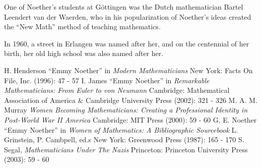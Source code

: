 \documentclass[12pt]{article}
\begin{document}
One of Noether's students at G\"ottingen was the Dutch mathematician Bartel Leendert van der Waerden, who in his popularization of Noether's ideas created the ``New Math'' method of teaching mathematics.

In 1960, a street in Erlangen was named after her, and on the centennial of her birth, her old high school was also named after her.

\begin{thebibliography}{5}
 H. Henderson ``Emmy Noether'' in {\it Modern Mathematicians} New York: Facts On File, Inc. (1996): 47 - 57
 I. James ``Emmy Noether'' in {\it Remarkable Mathematicians: From Euler to von Neumann} Cambridge: Mathematical Association of America \& Cambridge University Press (2002): 321 - 326
 M. A. M. Murray {\it Women Becoming Mathematicians: Creating a Professional Identity in Post-World War II America} Cambridge: MIT Press (2000): 59 - 60
 G. E. Noether ``Emmy Noether'' in {\it Women of Mathematics: A Bibliographic Sourcebook} L. Grinstein, P. Cambpell, ed.s New York: Greenwood Press (1987): 165 - 170
 S. Segal, {\it Mathematicians Under The Nazis} Princeton: Princeton University Press (2003): 59 - 60
\end{thebibliography}
\end{document}
